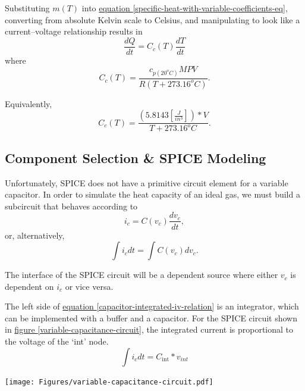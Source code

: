 \documentclass[10pt, twocolumn]{article}
\begin{document}
Substituting $m(T)$ into
\hyperref[specific-heat-with-variable-coefficients-eq]
{equation \ref{specific-heat-with-variable-coefficients-eq}},
converting from absolute Kelvin scale to Celsius, and
manipulating to look like a current--voltage relationship results in
\begin{equation}
\frac{dQ}{dt}=C_{c}(T)\frac{dT}{dt}
\end{equation}
where
\begin{equation}
C_{c}(T)=\frac{c_{p(20^{o}C)}MPV}{R(T+273.16^{o}C)}.
\label{bulk-air-capacitance-eq}
\end{equation}

Equivalently,
\begin{equation*}
C_{c}(T)=\frac{\left(5.8143\left[\frac{J}{in^{3}}\right]\right)*V}{T+273.16^{o}C}.
\end{equation*}

\subsection{Component Selection \& SPICE Modeling}


Unfortunately, SPICE does not have a primitive circuit element for
a variable capacitor.
In order to simulate the heat capacity of an ideal gas,
we must build a subcircuit that behaves according to
\begin{equation*}
i_{c}=C(v_{c})\frac{dv_{c}}{dt},
\label{capacitor-iv-relation}
\end{equation*}
or, alternatively,
\begin{equation}
\int i_{c}dt=\int C(v_{c})dv_{c}.
\label{capacitor-integrated-iv-relation}
\end{equation}

The interface of the SPICE circuit will be a dependent source
where either $v_{c}$ is dependent on $i_{c}$ or vice versa.

The left side of \hyperref[capacitor-integrated-iv-relation]
{equation \ref{capacitor-integrated-iv-relation}} is an integrator,
which can be implemented with a buffer and a capacitor.
For the SPICE circuit shown in
\hyperref[variable-capacitance-circuit]{figure \ref{variable-capacitance-circuit}},
the integrated current is proportional to the voltage of
the `int' node.
\begin{equation*}
\int i_{c}dt=C_{\textrm{int}}*v_{int}
\end{equation*}

\begin{center}
	\texttt{[image: Figures/variable-capacitance-circuit.pdf]}
	\label{variable-capacitance-circuit}
\end{center}
\end{document}
